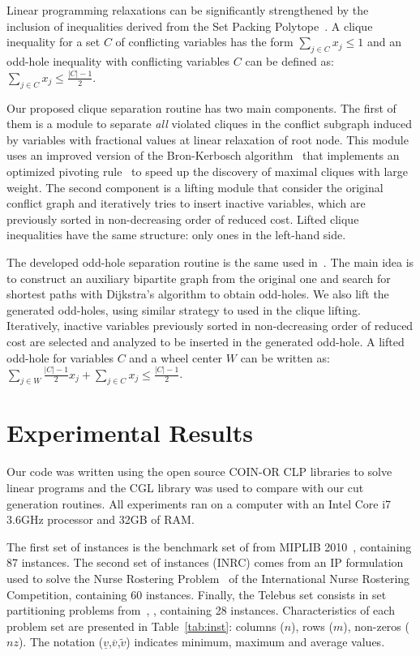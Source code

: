 \documentclass{endm}
\begin{document}
Linear programming relaxations can be significantly strengthened by the inclusion of inequalities derived from the Set Packing Polytope~\cite{Padberg1973,Rebennack2009}. A clique inequality for a set $C$ of conflicting variables has the form $\displaystyle \sum_{j\in C}x_{j} \leq 1$ and an odd-hole inequality with conflicting variables $C$ can be defined as: $\displaystyle \sum_{j\in C}x_{j} \leq \frac{|C|-1}{2}$.

Our proposed clique separation routine has two main components. The first of them is a module to separate \emph{all} violated cliques in the conflict subgraph induced by variables with fractional values at linear relaxation of root node. This module uses an improved version of the Bron-Kerbosch algorithm~\cite{Bron1973} that implements an optimized pivoting rule~\cite{Brito2011} to speed up the discovery of maximal cliques with large weight. The second component is a lifting module that consider the original conflict graph and iteratively tries to insert inactive variables, which are previously sorted in non-decreasing order of reduced cost. Lifted clique inequalities have the same structure: only ones in the left-hand side.

The developed odd-hole separation routine is the same used in~\cite{Rebennack2009}. The main idea is to construct an auxiliary bipartite graph from the original one and search for shortest paths with Dijkstra's algorithm to obtain odd-holes. We also lift the generated odd-holes, using similar strategy to used in the clique lifting. Iteratively, inactive variables previously sorted in non-decreasing order of reduced cost are selected and analyzed to be inserted in the generated odd-hole. A lifted odd-hole for variables $C$ and a wheel center $W$ can be written as: $\displaystyle \sum_{j \in W} \frac{|C|-1}{2} x_{j} + \sum_{j \in C} x_{j} \leq \frac{|C|-1}{2}$.

\section{Experimental Results}\label{experiments}

Our code was written using the open source COIN-OR \cite{LougeeHeimer2003} CLP libraries to solve linear programs and the CGL library was used to compare with our cut generation routines. All experiments ran on a computer with an Intel Core i7 3.6GHz processor and 32GB of RAM.

The first set of instances is the benchmark set of from MIPLIB 2010~\cite{miplib}, containing 87 instances. The second set of instances (INRC) comes from an IP formulation  used to solve the Nurse Rostering Problem~\cite{Santos2014} of the International Nurse Rostering Competition, containing 60 instances. Finally, the Telebus set consists in set partitioning problems from~\cite{Borndorfer1998}, , containing 28 instances. Characteristics of each problem set are presented in Table~\ref{tab:inst}: columns ($n$), rows ($m$), non-zeros ($nz$). The notation ($\underline{v}$,$\overline{v}$,$\tilde{v}$) indicates minimum, maximum and average values.
\end{document}
